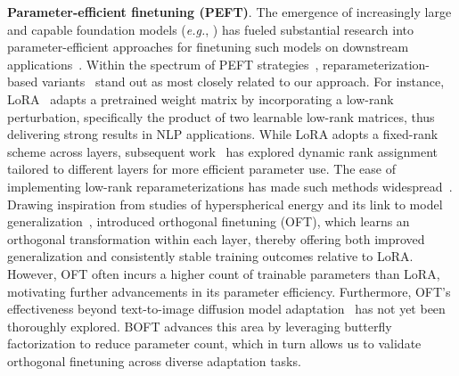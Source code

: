 \textbf{Parameter-efficient finetuning (PEFT)}. The emergence of increasingly large and capable foundation models (\emph{e.g.}, \cite{brown2020language,radford2021learning,rombach2022high,kirillov2023segment}) has fueled substantial research into parameter-efficient approaches for finetuning such models on downstream applications~\cite{treviso2023efficient,ding2023parameter,lialin2023scaling}. Within the spectrum of PEFT strategies~\cite{houlsby2019parameter,aghajanyan2020intrinsic,hulora2022,edalati2022krona,wang2022adamix,gheini2021cross,zaken2022bitfit,guo2020parameter,sung2021training,ansell2022composable,lester2021power,li2021prefix,vu2022spot,he2021towards,mao2021unipelt,karimi2021compacter,liu2022few,sung2022lst,chen2022parameter,jia2022visual,chen2022adaptformer,zhang2022neural,jie2023fact,lian2022scaling,luo2023towards}, reparameterization-based variants~\cite{aghajanyan2020intrinsic,hulora2022,edalati2022krona} stand out as most closely related to our approach. For instance, LoRA~\cite{hulora2022} adapts a pretrained weight matrix by incorporating a low-rank perturbation, specifically the product of two learnable low-rank matrices, thus delivering strong results in NLP applications. While LoRA adopts a fixed-rank scheme across layers, subsequent work~\cite{zhang2022adaptive,valipour2022dylora,zhang2023increlora} has explored dynamic rank assignment tailored to different layers for more efficient parameter use. The ease of implementing low-rank reparameterizations has made such methods widespread~\cite{dettmers2023qlora,zi2023delta,chavan2023one}. Drawing inspiration from studies of hyperspherical energy and its link to model generalization~\cite{liu2018learning,liu2021orthogonal}, \cite{qiu2023controlling} introduced orthogonal finetuning (OFT), which learns an orthogonal transformation within each layer, thereby offering both improved generalization and consistently stable training outcomes relative to LoRA. However, OFT often incurs a higher count of trainable parameters than LoRA, motivating further advancements in its parameter efficiency. Furthermore, OFT's effectiveness beyond text-to-image diffusion model adaptation~\cite{qiu2023controlling} has not yet been thoroughly explored. BOFT advances this area by leveraging butterfly factorization to reduce parameter count, which in turn allows us to validate orthogonal finetuning across diverse adaptation tasks.

